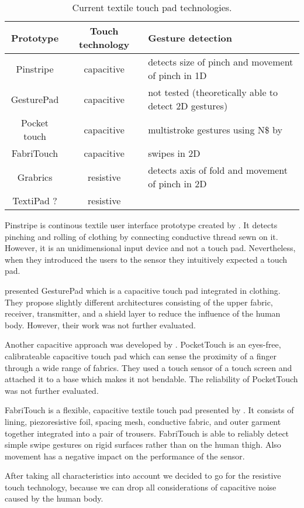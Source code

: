 \begin{table}
\begin{tabular}{ | c | c | p{3.8cm}|}
\hline
  Prototype & Touch technology & Gesture detection \\
  \hline
   Pinstripe & capacitive  & detects size of pinch and movement of pinch in 1D \\
   \hline
  GesturePad & capacitive &  not tested (theoretically able to detect 2D gestures) \\
  \hline
  Pocket touch & capacitive & multistroke gestures using N\$ by \cite{anthony2012n} \\
  FabriTouch & capacitive & swipes in 2D \\
  \hline
  Grabrics & resistive & detects axis of fold and movement of pinch in 2D \\ 
  \hline
  TextiPad ? & resistive  & \\
  \hline
\end{tabular}
\caption{Current textile touch pad technologies.}
 \label{table:overview}
\end{table}

Pinstripe is continous textile user interface prototype created by \cite{Karrer:2010:PEC:1866218.1866255}. It detects pinching and rolling of clothing by connecting conductive thread sewn on it. However, it is an unidimensional input device and not a touch pad. Nevertheless, when they introduced the users to the sensor they intuitively expected a touch pad. 

\cite{Rekimoto:2001:962092} presented GesturePad which is a capacitive touch pad integrated in clothing. They propose slightly different architectures consisting of the upper fabric, receiver, transmitter, and a shield layer to reduce the influence of the human body. However, their work was not further evaluated. 

Another capacitive approach was developed by \cite{Saponas:2011:PTC:2047196.2047235}. PocketTouch is an eyes-free, calibrateable capacitive touch pad which can sense the proximity of a finger through a wide range of fabrics. They used a touch sensor of a touch screen and attached it to a base which makes it not bendable. The reliability of PocketTouch was not further evaluated. 

FabriTouch is a flexible, capacitive textile touch pad presented by \cite{Heller:2014:FEF:2634317.2634345}. It consists of lining, piezoresistive foil, spacing mesh, conductive fabric, and outer garment together integrated into a pair of trousers. FabriTouch is able to reliably detect simple swipe gestures on rigid surfaces rather than on the human thigh. Also movement has a negative impact on the performance of the sensor.

After taking all characteristics into account we decided to go for the resistive touch technology, because we can drop all considerations of capacitive noise caused by the human body. 